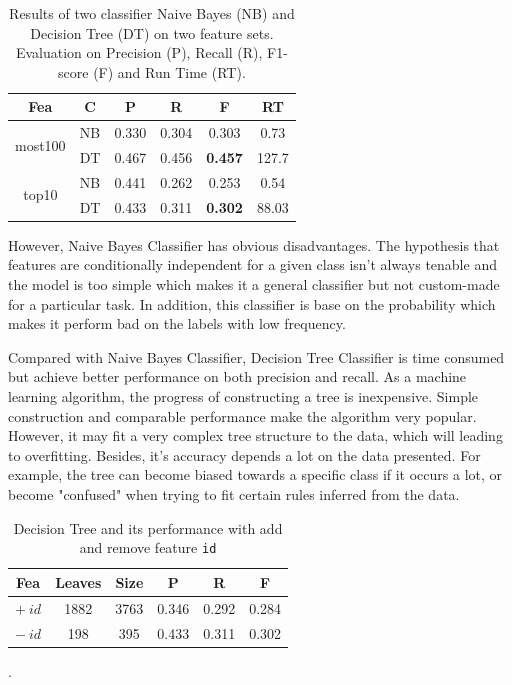 \documentclass[11pt]{article}
\begin{document}
\begin{table}[h]
	\centering
	\begin{tabular}{c|c|ccc|c}
		\hline
		\textbf{Fea} & \textbf{C} & \textbf{P} & \textbf{R} & \textbf{F} & \textbf{RT}\\
		\hline
		\multirow{2}{*}{most100} & NB & 0.330   &   0.304  &  0.303  &  0.73 \\
		& DT & 0.467  &    0.456   & \textbf{0.457}  & 127.7 \\
		\hline
		\multirow{2}{*}{top10} & NB &0.441  &    0.262  &  0.253  &  0.54 \\
		&	DT & 0.433   &   0.311  &  \textbf{0.302}  & 88.03  \\
		\hline
	\end{tabular}
	\caption{Results of two classifier Naive Bayes (NB) and Decision Tree (DT) on two feature sets. Evaluation on Precision (P), Recall (R), F1-score (F) and Run Time (RT).}
	\label{tab:4}
\end{table}

However, Naive Bayes Classifier has obvious disadvantages. The hypothesis that features are conditionally independent for a given class isn't always tenable and the model is too simple which makes it a general classifier but not custom-made for a particular task. In addition, this classifier is base on the probability which makes it perform bad on the labels with low frequency.

Compared with Naive Bayes Classifier, Decision Tree Classifier is time consumed but  achieve better performance on both precision and recall. As a machine learning algorithm, the  progress of constructing a tree is inexpensive. Simple construction and comparable performance make the algorithm very popular. However, it may fit a very complex tree structure to the data, which will leading to overfitting. Besides, it's accuracy depends a lot on the data presented. For example, the tree can become biased towards a specific class if it occurs a lot, or become "confused" when trying to fit certain rules inferred from the data. 

\begin{table}[h]
	\centering
	\begin{tabular}{c|cc|ccc}
		\hline
		\textbf{Fea} & \textbf{Leaves} & \textbf{Size} & \textbf{P} & \textbf{R} & \textbf{F}  \\
		\hline
		$+\ id$ & 1882 & 3763 & 0.346   &  0.292  &  0.284  \\
		$-\ id$ & 198 & 395 & 0.433  &   0.311  &  0.302   \\
		\hline
	\end{tabular}
	\caption{Decision Tree and its performance with add and remove feature \texttt{id}}.
	\label{tab:5}
\end{table}
	
\end{document}
